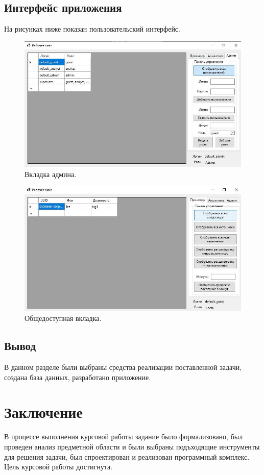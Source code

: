 \subsection{Интерфейс приложения}
На рисунках ниже показан пользовательский интерфейс.
\begin{figure}[H]
	\centering
	\includegraphics[scale=0.75]{admin.jpg}
	\caption{Вкладка админа.}
	\label{img:analytic}
\end{figure}
\begin{figure}[H]
	\centering
	\includegraphics[scale=0.75]{guest.jpg}
	\caption{Общедоступная вкладка.}
	\label{img:manager}
\end{figure}

\subsection{Вывод}
В данном разделе были выбраны средства реализации поставленной задачи, создана база данных, разработано приложение.
\newpage
\section*{Заключение}
В процессе выполнения курсовой работы задание было формализовано, был проведен анализ предметной области и были выбраны подъходящие инструменты для решения задачи, был спроектирован и реализован программный комплекс. \\
Цель курсовой работы достигнута.

